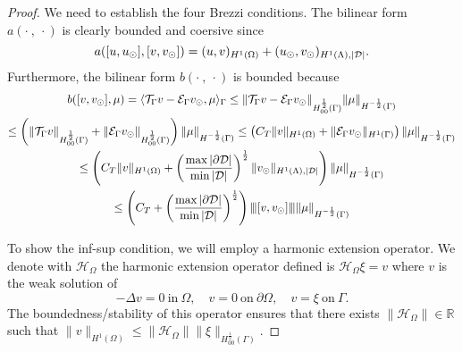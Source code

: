 \begin{proof}
We need to establish the four Brezzi conditions. 
The bilinear form $a(\cdot \ , \ \cdot)$ is clearly bounded and coersive since 
\begin{equation*}
a([u, u_{\odot}], [v, v_{\odot}]) = (u,v)_{H^1(\Omega)} + (u_{\odot}, v_{\odot})_{H^1(\Lambda), |\mathcal{D}|}.
\end{equation*}
Furthermore, the bilinear form $b(\cdot \ , \ \cdot)$ is bounded because
\begin{multline*}
b([v, v_{\odot}], \mu)= \langle {\mathcal{T}_\Gamma} v - \mathcal{E}_\Gamma v_{\odot} , \mu \rangle_\Gamma 
\leq \|{\mathcal{T}_\Gamma} v - \mathcal{E}_\Gamma v_{\odot}\|_{H^{\frac 12}_{00}(\Gamma)}\|\mu\|_{H^{-\frac 12}(\Gamma)}\\
\leq \left(\|{\mathcal{T}_\Gamma} v\|_{H^{\frac 12}_{00}(\Gamma)} + \|\mathcal{E}_\Gamma v_{\odot}\|_{H^{\frac 12}_{00}(\Gamma)}\right)\|\mu\|_{H^{-\frac 12}(\Gamma)}
\leq \left(C_T \|v\|_{H^1(\Omega)} + \|\mathcal{E}_\Gamma v_{\odot}\|_{H^1(\Gamma)}\right)\|\mu\|_{H^{-\frac 12}(\Gamma)}\\
\leq \left(C_T \|v\|_{H^1(\Omega)} + \left(\frac{\max |\partial\mathcal{D}|}{\min |\mathcal{D}|}\right)^{\frac 12} \|v_{\odot}\|_{H^1(\Lambda),|\mathcal{D}|}\right)\|\mu\|_{H^{-\frac 12}(\Gamma)}\\
\leq \left( C_T + \left(\frac{\max |\partial\mathcal{D}|}{\min |\mathcal{D}|}\right)^{\frac 12}\right) {\left\vert\kern-0.25ex\left\vert\kern-0.25ex\left\vert [v,v_{\odot}] \right\vert\kern-0.25ex\right\vert\kern-0.25ex\right\vert}\|\mu\|_{H^{-\frac 12}(\Gamma)}
\end{multline*}

To show the inf-sup condition, we will employ a harmonic extension operator. 
We denote with $\mathcal{H}_\Omega$ the harmonic extension operator defined is $\mathcal{H}_\Omega \xi = v$ where $v$ is the weak solution of
\begin{equation}\label{eq:harmonic}
-\Delta v=0 \ \text{in} \ \Omega,
\quad
v=0 \ \text{on} \ \partial \Omega,
\quad
v=\xi \ \text{on} \ \Gamma. 
\end{equation}
The boundedness/stability of this operator ensures that there exists $\| \mathcal{H}_\Omega \| \in \mathbb{R}$ such that
$\|v \|_{H^1(\Omega)}\leq \|\mathcal{H}_\Omega\| \|\xi \|_{H^{\frac 12}_{00}(\Gamma)}$. 



\end{proof}
